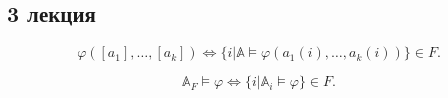 

\subsection{3 лекция}

\begin{stat}
    $$\varphi([a_1], \ldots, [a_k]) \Longleftrightarrow \{i| \mathbb{A} \models \varphi(a_1(i), \ldots, a_k(i))\} \in F.$$ 
\end{stat} 

\begin{stat}[Следствие]
    $$\mathbb{A}_F \models \varphi \Longleftrightarrow \{i | \mathbb{A}_i \models \varphi\} \in F.$$
\end{stat} 

